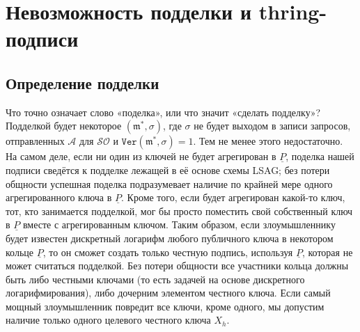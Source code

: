 \documentclass{mrl}
\theoremstyle{definition}
\numberwithin{theorem}{subsection}
\newcommand{\adversary}{\mathcal{A}}
\newcommand{\m}{\mathfrak{m}}
\begin{document}




\section{Невозможность подделки и thring-подписи}\label{unf}


\subsection{Определение подделки}

Что точно означает слово «поделка», или что значит «сделать подделку»? Подделкой будет некоторое $(\m^*, \sigma)$, где $\sigma$ не будет выходом в записи запросов, отправленных $\adversary$ для $\mathcal{SO}$ и $\texttt{Ver}(\m^*, \sigma)=1$. Тем не менее этого недостаточно. На самом деле, если ни один из ключей не будет агрегирован в $\underline{P}$, поделка нашей подписи сведётся к подделке лежащей в её основе схемы LSAG; без потери общности успешная поделка подразумевает наличие по крайней мере одного агрегированного ключа в $\underline{P}$. Кроме того, если будет агрегирован какой-то ключ, тот, кто занимается подделкой, мог бы просто поместить свой собственный ключ в $\underline{P}$ вместе с агрегированным ключом. Таким образом, если злоумышленнику будет известен дискретный логарифм любого публичного ключа в некотором кольце $\underline{P}$, то он сможет создать только честную подпись, используя $\underline{P}$, которая не может считаться подделкой. Без потери общности все участники кольца должны быть либо честными ключами (то есть задачей на основе дискретного логарифмирования), либо дочерним элементом честного ключа. Если самый мощный злоумышленник повредит все ключи, кроме одного, мы допустим наличие только одного целевого честного ключа $X_h$.
\end{document}
